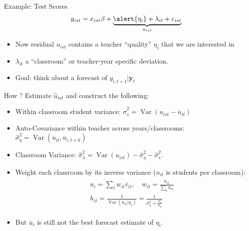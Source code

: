 \documentclass[xcolor=pdftex,dvipsnames,table,mathserif,aspectratio=169]{beamer}
\begin{document}
\begin{frame}{Example: Test Scores}
\begin{align*}
y_{ist} = x_{ist}\beta +  \underbrace{\alert{\eta_i}+ \lambda_{it} +  \varepsilon_{ist}}_{u_{ist}}
\end{align*}
\begin{itemize}
\item Now residual $u_{ist}$ contains a teacher ``quality'' $\eta_i$ that we are interested in
\item $\lambda_{it}$ a ``classroom'' or teacher-year specific deviation.
\item Goal: think about a forecast of $y_{i,t+1} | \mathbf{y}_{t}$
\end{itemize}
\end{frame}


\begin{frame}{How ?}
Estimate $\hat{u}_{ist}$ and construct the following:
\begin{itemize}
\item Within classroom student variance: $\hat{\sigma}_{s}^{2}=\operatorname{Var}\left(u_{i s t}-\overline{u}_{it} \right)$
\item Auto-Covariance within teacher across years/classrooms: $\hat{\sigma}_{\eta}^{2}=\operatorname{Var}\left(\overline{u}_{it}, \overline{u}_{i,t+k} \right)$
\item Classroom Variance: $\hat{\sigma}_{\lambda}^{2}=\operatorname{Var} (u_{ist} ) - \hat{\sigma}_{\eta}^{2} -\hat{\sigma}_{s}^{2}$. 
\item Weight each classroom by its inverse variance ($n_{it}$ is students per classroom):
\begin{align*}
\begin{array}{c}
\overline{u}_{i}=  \sum_{t} w_{it} \overline{v}_{it}, \quad 
 w_{it} = \frac{h_{it}}{\sum_t h_{it}} \\
 h_{it} = \frac{1}{\operatorname{Var} (\overline{u}_{it} | \eta_i )}  = \frac{1}{\sigma_{\lambda}^2 + \frac{\sigma_{s}^2}{n_{it}}} 
\end{array}
\end{align*}
\item But $\overline{u}_{i}$ is still not the best \alert{forecast} estimate of $\eta_i$.
\end{itemize}
\end{frame}
\end{document}

